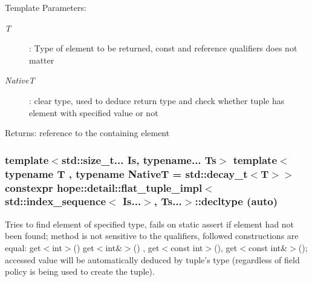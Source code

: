 \begin{Desc}
\item[Template Parameters:]
\begin{description}
\item[{\em T}]: Type of element to be returned, const and reference qualifiers does not matter\item[{\em NativeT}]: clear type, used to deduce return type and check whether tuple has element with specified value or not\end{description}
\end{Desc}
\begin{Desc}
\item[Returns:]reference to the containing element \end{Desc}
\hypertarget{classhope_1_1detail_1_1flat__tuple__impl_3_01std_1_1index__sequence_3_01_is_8_8_8_4_00_01_ts_8_8_8_4_6f82e0562ca06b099334fa7c08e0eb64}{
\subsubsection[{decltype}]{\setlength{\rightskip}{0pt plus 5cm}template$<$std::size\_\-t... Is, typename... Ts$>$ template$<$typename T , typename NativeT  = std::decay\_\-t$<$T$>$$>$ constexpr hope::detail::flat\_\-tuple\_\-impl$<$ std::index\_\-sequence$<$ Is...$>$, Ts...$>$::decltype (auto)}}
\label{classhope_1_1detail_1_1flat__tuple__impl_3_01std_1_1index__sequence_3_01_is_8_8_8_4_00_01_ts_8_8_8_4_6f82e0562ca06b099334fa7c08e0eb64}


Tries to find element of specified type, fails on static assert if element had not been found; method is not sensitive to the qualifiers, followed constructions are equal: get$<$int$>$() get$<$int\&$>$() , get$<$const int$>$(), get$<$const int\&$>$(); accessed value will be automatically deduced by tuple's type (regardless of field policy is being used to create the tuple). 

